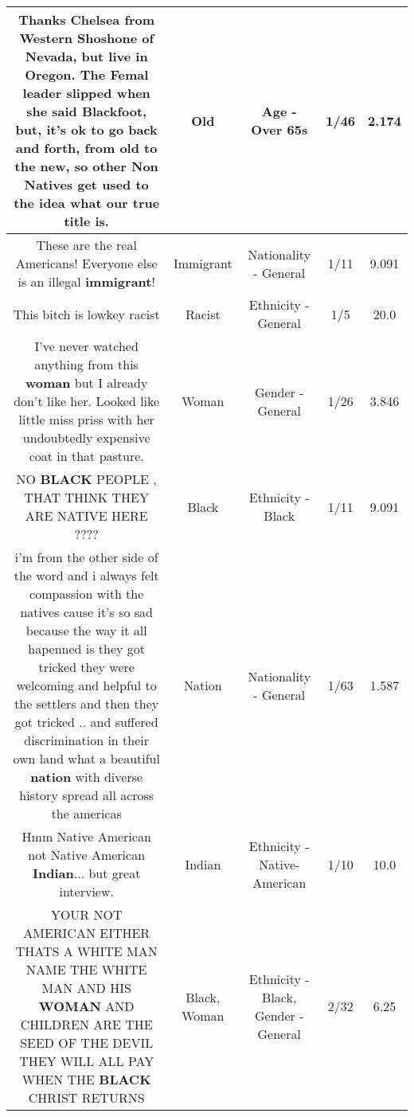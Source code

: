 \documentclass[11pt]{article}
\newlength\mylength
\begin{document}
\begin{center}
\begin{longtable}{|C{.65\mylength}|C{.30\mylength}|C{.12\mylength}|C{.12\mylength}|C{.12\mylength}|}
  \small Thanks Chelsea from Western Shoshone of Nevada, but live in Oregon. The Femal leader slipped when she said Blackfoot, but, it's ok to go back and forth, from \textbf{old} to the new, so other Non Natives get used to the idea what our true title is.\normalsize   & Old & Age - Over 65s & 1/46 & 2.174 \\  \hline
  \small These are the real Americans! Everyone else is an illegal \textbf{immigrant}!\normalsize   & Immigrant & Nationality - General & 1/11 & 9.091 \\  \hline
  \small This bitch is lowkey racist\normalsize   & Racist & Ethnicity - General & 1/5 & 20.0 \\  \hline
  \small I've never watched anything from this \textbf{woman} but I already don't like her. Looked like little miss priss with her undoubtedly expensive coat in that pasture.\normalsize   & Woman & Gender - General & 1/26 & 3.846 \\  \hline
  \small NO \textbf{BLACK} PEOPLE , THAT THINK THEY ARE NATIVE HERE ????\normalsize   & Black & Ethnicity - Black & 1/11 & 9.091 \\  \hline
  \small i'm from the other side of the word and i always felt compassion with the natives cause it's so sad because the way it all hapenned is they got tricked they were welcoming and helpful to the settlers and then they got tricked .. and suffered discrimination in their own land what a beautiful \textbf{nation} with diverse history spread all across the americas\normalsize   & Nation & Nationality - General & 1/63 & 1.587 \\  \hline
  \small Hmm Native American not Native American \textbf{Indian}... but great interview.\normalsize   & Indian & Ethnicity - Native-American & 1/10 & 10.0 \\  \hline
  \small YOUR NOT AMERICAN EITHER THATS A WHITE MAN NAME THE WHITE MAN AND HIS \textbf{WOMAN} AND CHILDREN ARE THE SEED OF THE DEVIL THEY WILL ALL PAY WHEN THE \textbf{BLACK} CHRIST RETURNS\normalsize   & Black, Woman & Ethnicity - Black, Gender - General & 2/32 & 6.25 \\  \hline

\end{longtable}
\end{center}
\end{document}
